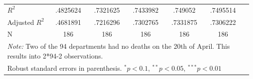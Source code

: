 \documentclass[a4paper]{article}
\theoremstyle{plain}
\theoremstyle{definition}
\begin{document}
\begin{table}
{\begin{tabular}{l*{6}{c}}
  \\
\hline 
$R^2$            &    .4825624   &    .7321625   &    .7433982   &     .749052   &    .7495514   \\
Adjusted $R^2$     &    .4681891   &    .7216296   &    .7302765   &    .7331875   &    .7306222   \\
N               &         186   &         186   &         186   &         186   &         186   \\
\hline\hline 
\multicolumn{6}{l}{\small\textit{Note:} Two of the 94 departments had no deaths on the 20th of April. This results into 2*94-2 observations.}    \\
\multicolumn{6}{l}{\small Robust standard errors in parenthesis. $^{*} p<0.1$, $^{**} p < 0.05$, $^{***} p < 0.01$} 
\end{tabular}   }
\end{table}
\end{document}
